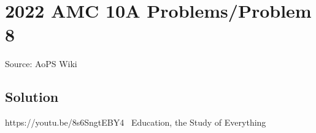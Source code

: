 \documentclass[12pt]{article}
\begin{document}
\section*{{2022 AMC 10A Problems/Problem 8}}
Source: AoPS Wiki

\subsection*{Solution}
https://youtu.be/8s6SngtEBY4 ~Education, the Study of Everything
\end{document}
